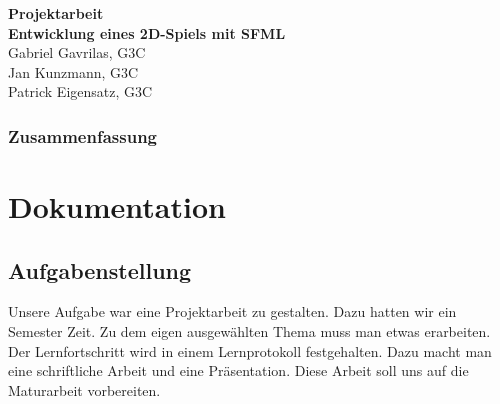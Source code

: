 \documentclass[11pt,a4paper]{scrbook}
\begin{document}
\begin{titlepage}
\begin{center}

\vspace*{3cm}
\textbf{\huge{Projektarbeit}}\\
\vspace*{2cm}
\textbf{\large{Entwicklung eines 2D-Spiels mit SFML}}\\
\vspace*{5cm}
Gabriel Gavrilas, G3C\\
Jan Kunzmann, G3C\\
Patrick Eigensatz, G3C
\end{center}
\end{titlepage}


\clearpage
\thispagestyle{empty}


\section*{Zusammenfassung}


\thispagestyle{empty}
\clearscrheadfoot
\rofoot[\pagemark]{\pagemark}
\lefoot[\pagemark]{\pagemark}
\thispagestyle{empty}
\tableofcontents

\clearpage
{}



\part{Dokumentation}
\chapter{Aufgabenstellung} 
Unsere Aufgabe war eine Projektarbeit zu gestalten. Dazu hatten wir ein Semester Zeit.
Zu dem eigen ausgewählten Thema muss man etwas erarbeiten. Der Lernfortschritt wird in einem Lernprotokoll festgehalten.
Dazu macht man eine schriftliche Arbeit und eine Präsentation. Diese Arbeit soll uns auf die Maturarbeit vorbereiten.
\end{document}
